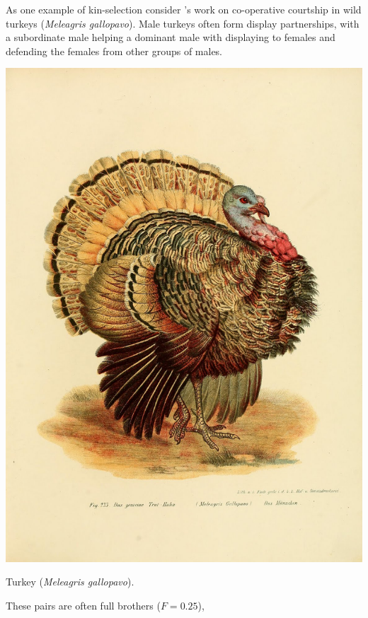 As one example of kin-selection consider \citet{krakauer2005kin}'s work on
co-operative courtship in wild turkeys ({\it Meleagris
  gallopavo}). Male turkeys often form display
partnerships, with a subordinate male helping a dominant male with
displaying to females and defending the females from other groups of males. \begin{marginfigure}
\begin{center}
\includegraphics[width= \textwidth]{illustration_images/Quant_gen/Turkey/turkey.jpg}
\end{center}
\caption{Turkey  ({\it Meleagris
  gallopavo}).  } \label{fig:turkey}
\end{marginfigure}  These pairs are often full brothers ($F=0.25$),
